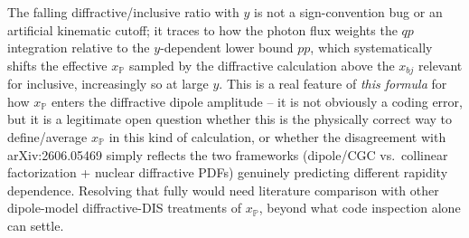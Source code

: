 \documentclass[11pt]{article}
\begin{document}
The falling diffractive/inclusive ratio with $y$ is not a sign-convention
bug or an artificial kinematic cutoff; it traces to how the photon flux
weights the $qp$ integration relative to the $y$-dependent lower bound
$pp$, which systematically shifts the effective $x_{\mathbb P}$ sampled
by the diffractive calculation above the $x_{bj}$ relevant for inclusive,
increasingly so at large $y$. This is a real feature of \emph{this
formula} for how $x_{\mathbb P}$ enters the diffractive dipole
amplitude -- it is not obviously a coding error, but it is a legitimate
open question whether this is the physically correct way to define/average
$x_{\mathbb P}$ in this kind of calculation, or whether the disagreement
with arXiv:2606.05469 simply reflects the two frameworks (dipole/CGC vs.\
collinear factorization + nuclear diffractive PDFs) genuinely predicting
different rapidity dependence. Resolving that fully would need literature
comparison with other dipole-model diffractive-DIS treatments of
$x_{\mathbb P}$, beyond what code inspection alone can settle.
\end{document}
